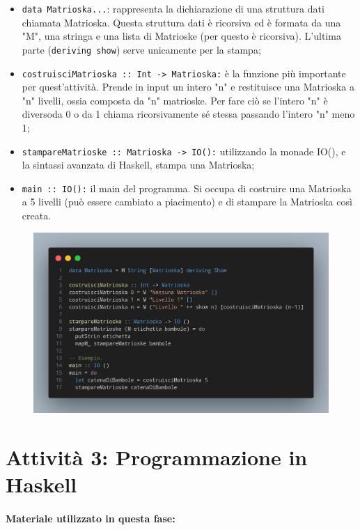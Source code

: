 \begin{itemize}
    \item \texttt{data Matrioska...}: rappresenta la dichiarazione di una struttura dati chiamata
    Matrioska. Questa struttura dati è ricorsiva ed è formata da una "M", una stringa e una lista di Matrioske (per questo è ricorsiva).
    L'ultima parte (\texttt{deriving show}) serve unicamente per la stampa;
    \item \texttt{costruisciMatrioska :: Int -> Matrioska:} è la funzione più importante per quest'attività.
    Prende in input un intero "n" e restituisce una Matrioska a "n" livelli, ossia composta da "n" matrioske.
    Per fare ciò se l'intero "n" è diversoda 0 o da 1 chiama ricorsivamente sé stessa passando l'intero "n" meno 1;
    \item \texttt{stampareMatrioske :: Matrioska -> IO():} utilizzando la monade IO(), e la sintassi avanzata di Haskell, 
    stampa una Matrioska;
    \item \texttt{main :: IO():} il main del programma. Si occupa di costruire una Matrioska a 5 livelli (può essere cambiato a piacimento)
    e di stampare la Matrioska così creata.
\end{itemize}

\begin{figure}[!h]
    \centering
    \includegraphics[width=1\textwidth]{images/Matrioske.png}
\end{figure}

\clearpage

\section{Attività 3: Programmazione in Haskell}

\paragraph{Materiale utilizzato in questa fase:}

